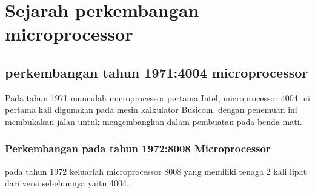\section{Sejarah perkembangan microprocessor}
	\subsection{perkembangan tahun 1971:4004 microprocessor}
	Pada tahun 1971 munculah microprocessor pertama Intel, microprocessor 4004 ini pertama kali digunakan pada mesin kalkulator Busicom. dengan penemuan ini membukakan jalan untuk mengembangkan dalam pembuatan pada benda mati.
	\subsubsection{Perkembangan pada tahun 1972:8008 Microprocessor}
	pada tahun 1972 keluarlah microprocessor 8008 yang memiliki tenaga 2 kali lipat dari versi sebelumnya yaitu 4004.